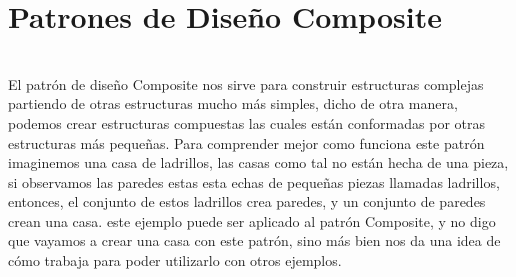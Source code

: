 \section{Patrones de Diseño Composite} 

\textbf{}\\
El patrón de diseño Composite nos sirve para construir estructuras complejas partiendo de otras estructuras mucho más simples, dicho de otra manera, podemos crear estructuras compuestas las cuales están conformadas por otras estructuras más pequeñas.
Para comprender mejor como funciona este patrón imaginemos una casa de ladrillos, las casas como tal no están hecha de una pieza, si observamos las paredes estas esta echas de pequeñas piezas llamadas ladrillos, entonces, el conjunto de estos ladrillos crea paredes, y un conjunto de paredes crean una casa. este ejemplo puede ser aplicado al patrón Composite, y no digo que vayamos a crear una casa con este patrón, sino más bien nos da una idea de cómo trabaja para poder utilizarlo con otros ejemplos.

